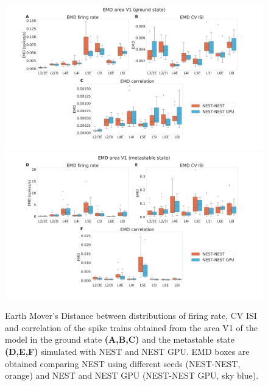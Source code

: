 \documentclass[a4paper, 12pt, twoside, openright]{book}
\begin{document}
\begin{figure}[H]
    \centering
    \includegraphics[trim=6cm 0 6cm 0, clip,width=\columnwidth]{figures/emd_boxplot_sample_gs.pdf}
    \includegraphics[trim=6cm 0 6cm 0, clip,width=\columnwidth]{figures/emd_boxplot_sample_ms.pdf}
    \caption{Earth Mover’s Distance between distributions of firing rate, CV ISI and correlation of the spike trains obtained from the area V1 of the model in the ground state \textbf{(A,B,C)} and the metastable state \textbf{(D,E,F)} simulated with NEST and NEST GPU. EMD boxes are obtained comparing NEST using different seeds (NEST-NEST, orange) and NEST and NEST GPU (NEST-NEST GPU, sky blue).}
    \label{fig:mam_sample_emd}
\end{figure}
\end{document}
